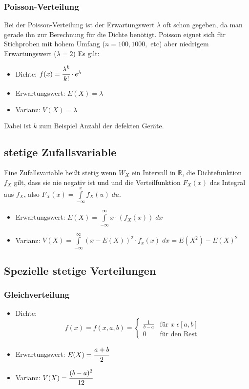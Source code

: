 \documentclass[a4paper]{scrartcl}
\begin{document}
            \subsubsection{Poisson-Verteilung}
                Bei der Poisson-Verteilung ist der Erwartungswert \(\lambda\) oft schon gegeben, da man gerade ihn zur Berechnung für die Dichte benötigt. 
                Poisson eignet sich für Stichproben mit hohem Umfang (\(n = 100, 1000,\) etc) aber niedrigem Erwartungswert (\(\lambda = 2\)) Es gilt:
                \begin{itemize}
                    \item Dichte: \(f(x) = \cfrac{\lambda^k}{k!} \cdot e^\lambda\)
                    \item Erwartungswert: \(E(X) = \lambda\)
                    \item Varianz: \(V(X) = \lambda\)
                \end{itemize} 
                Dabei ist \(k\) zum Beispiel Anzahl der defekten Geräte.
            
        \subsection{stetige Zufallsvariable}
            Eine Zufallsvariable heißt stetig wenn \(W_X\) ein Intervall in \(\mathbb{R}\), die Dichtefunktion \(f_X\) gilt, dass sie nie negativ ist und und die Verteilfunktion 
            \(F_X(x)\) das Integral aus \(f_X\), also \(F_X(x) = \int\limits_{-\infty }^x f_X(u) \; du\). 
            \begin{itemize}
                \item Erwartungswert: \(E(X) = \int\limits_{-\infty}^{\infty} x \cdot (f_X(x)) \; dx \)
                \item Varianz: \(V(X) = \int\limits_{-\infty}^{\infty} (x - E(X))^2 \cdot f_x(x) \; dx = E(X^2) - E(X)^2 \)
            \end{itemize}
        \subsection{Spezielle stetige Verteilungen}
            \subsubsection{Gleichverteilung}
            \begin{itemize}
                \item Dichte: \[f(x) = f(x,a,b)=
                                \begin{cases}
                                    \frac{1}{b - a}     & \text{für } x \; \epsilon [a, b] \\
                                    0     & \text{für den Rest} 
                                \end{cases}
                            \] 
                \item Erwartungswert: \(E(X) = \cfrac{a+b}{2} \)
                \item Varianz: \(V(X) = \cfrac{(b-a)^2}{12} \)
            \end{itemize}
\end{document}
